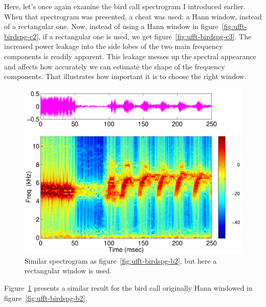 Here, let's once again examine the bird call spectrogram I introduced
earlier. When that spectrogram was presented, a cheat was used: a Hann
window, instead of a rectangular one. Now, instead of using a Hann
window in figure~\ref{fig:ufft-birdspg-c2}, if a rectangular one is used,
we get figure~\ref{fig:ufft-birdspg-c3}. The increased power leakage
into the side lobes of the two main frequency components is readily
apparent. This leakage messes up the spectral appearance and affects
how accurately we can estimate the shape of the frequency components.
That illustrates how important it is to choose the right window.

\begin{figure}
\centerline{\includegraphics[height=0.5\textheight]{ch-fft/ufft_bluewing1am_spg128_127rect}}
\caption{Similar spectrogram as figure~\ref{fig:ufft-birdspg-b2}, but
here a rectangular window is used.\label{fig:ufft-birdspg-b3}}
\end{figure}

Figure~\ref{fig:ufft-birdspg-b3} presents a similar result for the
bird call originally Hann windowed in
figure~\ref{fig:ufft-birdspg-b2}.


